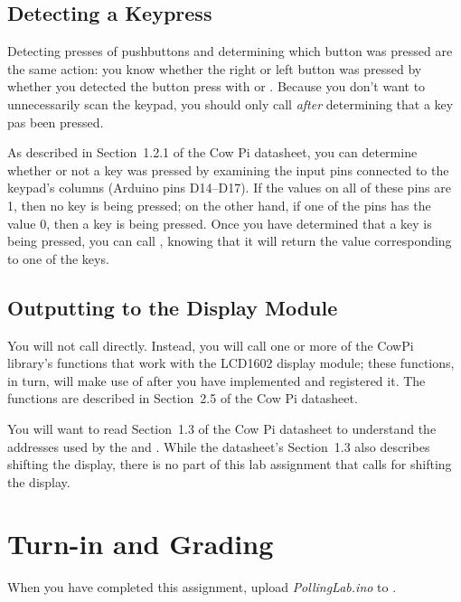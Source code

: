 \subsection{Detecting a Keypress}

Detecting presses of pushbuttons and determining which button was pressed are the same action: you know whether the right or left button was pressed by whether you detected the button press with  or .
Because you don't want to unnecessarily scan the keypad, you should only call  \textit{after} determining that a key pas been pressed.

As described in Section~1.2.1 of the Cow Pi datasheet, you can determine whether or not a key was pressed by examining the input pins connected to the keypad's columns (Arduino pins D14--D17).
If the values on all of these pins are 1, then no key is being pressed;
on the other hand, if one of the pins has the value 0, then a key is being pressed.
Once you have determined that a key is being pressed, you can call , knowing that it will return the value corresponding to one of the keys.


\subsection{Outputting to the Display Module}

You will not call  directly.
Instead, you will call one or more of the CowPi library's functions that work with the LCD1602 display module; these functions, in turn, will make use of  after you have implemented and registered it.
The functions are described in Section~2.5 of the Cow Pi datasheet.

You will want to read Section~1.3 of the Cow Pi datasheet to understand the addresses used by the  and .
While the datasheet's Section~1.3 also describes shifting the display, there is no part of this lab assignment that calls for shifting the display.



\section{Turn-in and Grading}

When you have completed this assignment, upload \textit{PollingLab.ino} to
\filesubmission.

